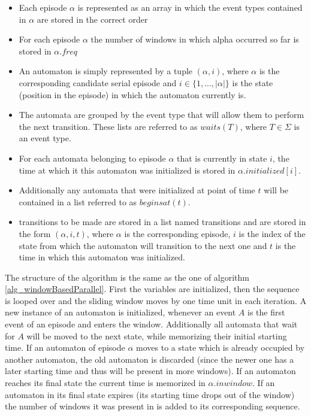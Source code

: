 \begin{itemize}
	 \item Each episode $\alpha$ is represented as an array in which the event types contained in $\alpha$ are stored in the correct order
	\item For each episode $\alpha$ the number of windows in which alpha occurred so far is stored in $\alpha .freq$
	\item An automaton is simply represented by a tuple $(\alpha ,i)$, where $\alpha$ is the corresponding candidate serial episode and $i \in \{1,...,|\alpha |\}$ is the state (position in the episode) in which the automaton currently is.
	\item The automata are grouped by the event type that will allow them to perform the next transition. These lists are referred to as $waits(T)$, where $T \in \Sigma$ is an event type.
	\item For each automata belonging to episode $\alpha$ that is currently in state $i$, the time at which it this automaton was initialized is stored in $\alpha .initialized[i]$.
	\item Additionally any automata that were initialized at point of time $t$ will be contained in a list referred to as $beginsat(t)$.
	\item transitions to be made are stored in a list named transitions and are stored in the form $(\alpha ,i,t)$, where $\alpha$ is the corresponding episode, $i$ is the index of the state from which the automaton will transition to the next one and $t$ is the time in which this automaton was initialized.
\end{itemize}

The structure of the algorithm is the same as the one of algorithm \ref{alg_windowBasedParallel}. First the variables are initialized, then the sequence is looped over and the sliding window moves by one time unit in each iteration. A new instance of an automaton is initialized, whenever an event $A$ is the first event of an episode and enters the window. Additionally all automata that wait for $A$ will be moved to the next state, while memorizing their initial starting time. If an automaton of episode $\alpha$ moves to a state which is already occupied by another automaton, the old automaton is discarded (since the newer one has a later starting time and thus will be present in more windows). If an automaton reaches its final state the current time is memorized in $\alpha .inwindow$. If an automaton in its final state expires (its starting time drops out of the window) the number of windows it was present in is added to its corresponding sequence.


